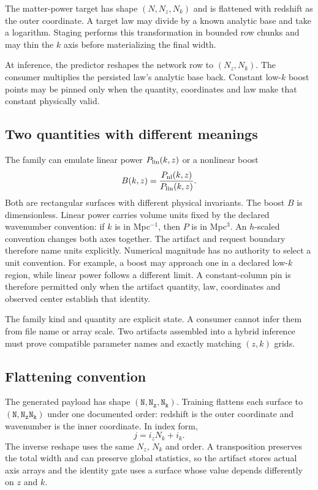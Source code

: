 \documentclass[10pt,aps,prd,twocolumn,nofootinbib]{revtex4-2}
\newcommand{\shape}[1]{\ensuremath{\mathtt{#1}}}
\begin{document}
The matter-power target has shape $(N,N_z,N_k)$ and is flattened with redshift
as the outer coordinate.  A target law may divide by a known analytic base and
take a logarithm.  Staging performs this transformation in bounded row chunks
and may thin the $k$ axis before materializing the final width.

At inference, the predictor reshapes the network row to $(N_z,N_k)$.  The
consumer multiplies the persisted law's analytic base back.  Constant low-$k$
boost points may be pinned only when the quantity, coordinates and law make
that constant physically valid.

\subsection{Two quantities with different meanings}

The family can emulate linear power \(P_{\rm lin}(k,z)\) or a nonlinear boost
\begin{equation*}
  B(k,z)=\frac{P_{\rm nl}(k,z)}{P_{\rm lin}(k,z)}.
\end{equation*}
Both are rectangular surfaces with different physical invariants.  The boost
\(B\) is dimensionless.  Linear power carries volume units fixed by
the declared wavenumber convention: if \(k\) is in Mpc\(^{-1}\), then
\(P\) is in Mpc\(^3\).  An \(h\)-scaled convention changes both axes together.
The artifact and request boundary therefore name units explicitly.  Numerical
magnitude has no authority to select a unit convention.
For example, a boost may approach one in a declared low-\(k\) region, while
linear power follows a different limit.  A constant-column pin is therefore permitted only when the
artifact quantity, law, coordinates and observed center establish that
identity.

The family kind and quantity are explicit state.  A consumer cannot infer
them from file name or array scale.  Two artifacts assembled into a hybrid
inference must prove compatible parameter names and exactly matching
\((z,k)\) grids.

\subsection{Flattening convention}

The generated payload has shape \shape{(N,N_z,N_k)}.  Training flattens each
surface to \shape{(N,N_zN_k)} under one documented order: redshift is the outer
coordinate and wavenumber is the inner coordinate.  In index form,
\begin{equation*}
  j=i_zN_k+i_k.
\end{equation*}
The inverse reshape uses the same \(N_z\), \(N_k\) and order.  A transposition
preserves the total width and can preserve global statistics, so the artifact
stores actual axis arrays and the identity gate uses a surface whose value
depends differently on \(z\) and \(k\).
\end{document}
